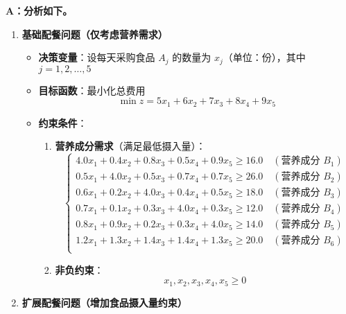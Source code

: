 \textbf{A：分析如下。}
\begin{enumerate}
    \item \textbf{基础配餐问题（仅考虑营养需求）}
    \begin{itemize}
        \item \textbf{决策变量}：设每天采购食品 $ A_j $ 的数量为 $ x_j $（单位：份），其中 $ j=1,2,\dots,5 $
        \item \textbf{目标函数}：最小化总费用
        $$
        \min z = 5x_1 + 6x_2 + 7x_3 + 8x_4 + 9x_5
        $$
        \item \textbf{约束条件}：
        \begin{enumerate}
            \item \textbf{营养成分需求}（满足最低摄入量）：
            $$
            \begin{cases}
            4.0x_1 + 0.4x_2 + 0.8x_3 + 0.5x_4 + 0.9x_5 \geq 16.0 \quad (\text{营养成分 } B_1) \\
            0.5x_1 + 4.0x_2 + 0.5x_3 + 0.7x_4 + 0.7x_5 \geq 26.0 \quad (\text{营养成分 } B_2) \\
            0.6x_1 + 0.2x_2 + 4.0x_3 + 0.4x_4 + 0.5x_5 \geq 18.0 \quad (\text{营养成分 } B_3) \\
            0.7x_1 + 0.1x_2 + 0.3x_3 + 4.0x_4 + 0.3x_5 \geq 12.0 \quad (\text{营养成分 } B_4) \\
            0.8x_1 + 0.9x_2 + 0.2x_3 + 0.3x_4 + 4.0x_5 \geq 14.0 \quad (\text{营养成分 } B_5) \\
            1.2x_1 + 1.3x_2 + 1.4x_3 + 1.4x_4 + 1.3x_5 \geq 20.0 \quad (\text{营养成分 } B_6) \\
            \end{cases}
            $$
            \item \textbf{非负约束}：
            $$
            x_1, x_2, x_3, x_4, x_5 \geq 0
            $$
        \end{enumerate}
    \end{itemize}
    
    \item \textbf{扩展配餐问题（增加食品摄入量约束）}
    

\end{enumerate}

